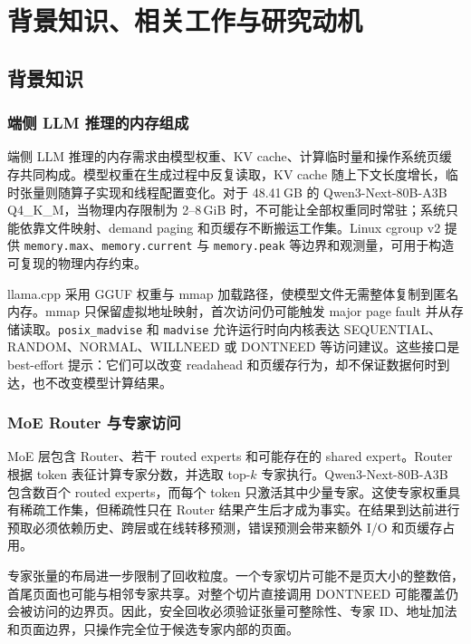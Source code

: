 \section{背景知识、相关工作与研究动机}
\label{sec:background}

\subsection{背景知识}

\subsubsection{端侧 LLM 推理的内存组成}

端侧 LLM 推理的内存需求由模型权重、KV cache、计算临时量和操作系统页缓存共同构成。模型权重在生成过程中反复读取，KV cache 随上下文长度增长，临时张量则随算子实现和线程配置变化。对于 48.41\,GB 的 Qwen3-Next-80B-A3B Q4\_K\_M，当物理内存限制为 2--8\,GiB 时，不可能让全部权重同时常驻；系统只能依靠文件映射、demand paging 和页缓存不断搬运工作集。Linux cgroup v2 提供 \texttt{memory.max}、\texttt{memory.current} 与 \texttt{memory.peak} 等边界和观测量，可用于构造可复现的物理内存约束\cite{cgroupsv2}。

llama.cpp 采用 GGUF 权重与 mmap 加载路径，使模型文件无需整体复制到匿名内存\cite{llamacpp2024}。mmap 只保留虚拟地址映射，首次访问仍可能触发 major page fault 并从存储读取。\texttt{posix\_madvise} 和 \texttt{madvise} 允许运行时向内核表达 SEQUENTIAL、RANDOM、NORMAL、WILLNEED 或 DONTNEED 等访问建议\cite{posix_madvise}。这些接口是 best-effort 提示：它们可以改变 readahead 和页缓存行为，却不保证数据何时到达，也不改变模型计算结果。

\subsubsection{MoE Router 与专家访问}

MoE 层包含 Router、若干 routed experts 和可能存在的 shared expert。Router 根据 token 表征计算专家分数，并选取 top-$k$ 专家执行\cite{shazeer2017moe,fedus2022switch}。Qwen3-Next-80B-A3B 包含数百个 routed experts，而每个 token 只激活其中少量专家\cite{qwen3next2024}。这使专家权重具有稀疏工作集，但稀疏性只在 Router 结果产生后才成为事实。在结果到达前进行预取必须依赖历史、跨层或在线转移预测，错误预测会带来额外 I/O 和页缓存占用。

专家张量的布局进一步限制了回收粒度。一个专家切片可能不是页大小的整数倍，首尾页面也可能与相邻专家共享。对整个切片直接调用 DONTNEED 可能覆盖仍会被访问的边界页。因此，安全回收必须验证张量可整除性、专家 ID、地址加法和页面边界，只操作完全位于候选专家内部的页面。

